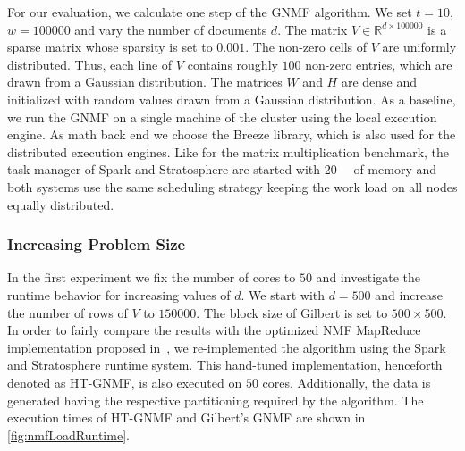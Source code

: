 For our evaluation, we calculate one step of the GNMF algorithm.
We set $t=10$, $w=100000$ and vary the number of documents $d$.
The matrix $V\in\mathbb{R}^{d\times 100000}$ is a sparse matrix whose sparsity is set to $0.001$.
The non-zero cells of $V$ are uniformly distributed.
Thus, each line of $V$ contains roughly $100$ non-zero entries, which are drawn from a Gaussian distribution.
The matrices $W$ and $H$ are dense and initialized with random values drawn from a Gaussian distribution.
As a baseline, we run the GNMF on a single machine of the cluster using the local execution engine.
As math back end we choose the Breeze library, which is also used for the distributed execution engines.
Like for the matrix multiplication benchmark, the task manager of Spark and Stratosphere are started with \SI{20}{\giga\byte} of memory and both systems use the same scheduling strategy keeping the work load on all nodes equally distributed.

\subsubsection{Increasing Problem Size}

In the first experiment we fix the number of cores to $50$ and investigate the runtime behavior for increasing values of $d$.
We start with $d=500$ and increase the number of rows of $V$ to $150000$.
The block size of Gilbert is set to $500 \times 500$.
In order to fairly compare the results with the optimized NMF MapReduce implementation proposed in~\cite{liu:2010a}, we re-implemented the algorithm using the Spark and Stratosphere runtime system.
This hand-tuned implementation, henceforth denoted as HT-GNMF, is also executed on $50$ cores.
Additionally, the data is generated having the respective partitioning required by the algorithm.
The execution times of HT-GNMF and Gilbert's GNMF are shown in \cref{fig:nmfLoadRuntime}.

